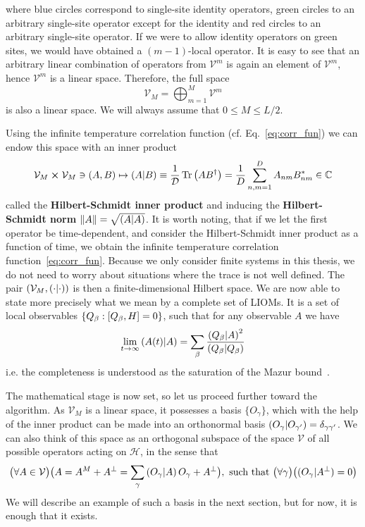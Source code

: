 where blue circles correspond to single-site identity operators, green circles to an arbitrary
single-site operator except for the identity and red circles to an arbitrary single-site operator.
If we were to allow identity operators on green sites, we would have obtained a \((m-1)\)-local operator.
It is easy to see that an arbitrary linear combination of operators from \(\mathcal{V}^m\) is again
an element of \(\mathcal{V}^m\), hence \(\mathcal{V}^m\) is a linear space. Therefore,
the full space
\begin{equation}
  \mathcal{V}_{M} = \bigoplus_{m=1}^{M} \mathcal{V}^m
\end{equation}
is also a linear space. We will always assume that \(0\leq M \leq L/2\).

Using the infinite temperature correlation function (cf. Eq.~\eqref{eq:corr_fun}) we can endow this space with an inner product
\begin{equation}
  \mathcal{V}_M \cross \mathcal{V}_M \ni (A, B) \mapsto \left(A \middle| B\right)
  \equiv \frac{1}{\mathcal{D}}\Tr\left(AB^{\dagger}\right) = \frac{1}{D}\sum_{n,m = 1}^{D} A_{nm} B_{nm}^{\ast} \in \mathbb{C}
  \label{eq:hs_prod}
\end{equation}
called the \textbf{Hilbert-Schmidt inner product} and
inducing the \textbf{Hilbert-Schmidt norm} \(\norm{A} = \sqrt{\left(A \middle| A\right)}\). It is worth noting, that
if we let the first operator be time-dependent, and consider the Hilbert-Schmidt inner product
as a function of time, we obtain the infinite temperature correlation function~\eqref{eq:corr_fun}.
Because we only consider finite systems in this thesis, we do not need to worry about
situations where the trace is not well defined. The pair \( (\mathcal{V}_M, \left(\cdot \middle| \cdot\right)) \)
is then a finite-dimensional Hilbert space.
We are now able to state more precisely what we mean by a complete set of LIOMs.
It is a set of local observables \(\{Q_{\beta} : \comm{Q_{\beta}}{H} = 0\}\), such that
for any observable \(A\) we have
\begin{equation}
  \lim_{t\to\infty} \left(A(t) \middle| A\right) = \sum_{\beta} \frac{\left(Q_{\beta} \middle| A\right)^2}{\left(Q_{\beta} \middle| Q_{\beta}\right)}
\end{equation}
i.e. the completeness is understood as the saturation of the Mazur bound~\autocite{Mazur1969}.

The mathematical stage is now set, so let us proceed further toward the algorithm.
As \(\mathcal{V}_M\) is a linear space, it possesses a basis \(\{O_{\gamma}\}\),
which with the help of the inner product can be made into an orthonormal basis \(\left(O_{\gamma} \middle| O_{\gamma^{\prime}}\right) = \delta_{\gamma\gamma^{\prime}}\).
We can also think of this space as an orthogonal subspace of the space \(\mathcal{V}\) of all possible operators
acting on \(\mathcal{H}\), in the sense that
\begin{equation}
  \big(\forall A \in \mathcal{V} \big) \big( A = A^M + A^{\perp} = \sum_{\gamma} \left(O_{\gamma} \middle| A\right) O_{\gamma} + A^{\perp}\big) ,
  \text{ such that } \big(\forall \gamma\big) \big( ({O_{\gamma}}|{A^{\perp}}) = 0\big)
  \label{eq:decomposition}
\end{equation}
We will describe an example of such a basis in the next section, but for now, it is enough that it exists.

